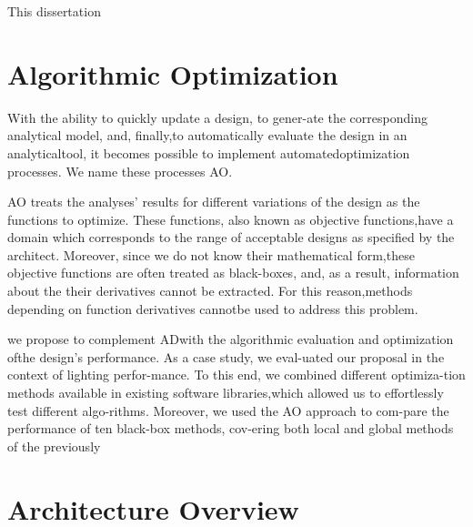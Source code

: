 \cleardoublepage
\label{chap:architecture}


This dissertation

\section{Algorithmic Optimization}

With the ability to quickly update a design, to gener-ate the corresponding analytical model, and, finally,to automatically evaluate the design in an analyticaltool, it becomes possible to implement automatedoptimization processes.  We name these processes \ac{AO}.

AO treats the analyses’ results for different variations of the design as the functions to optimize. These functions, also known as objective functions,have a domain which corresponds to the range of acceptable designs as specified by the architect. Moreover, since we do not know their mathematical form,these objective functions are often treated as black-boxes, and, as a result, information about the their derivatives cannot be extracted.  For this reason,methods depending on function derivatives cannotbe used to address this problem.  

we propose to complement ADwith the algorithmic evaluation and optimization ofthe design’s performance. As a case study, we eval-uated our proposal in the context of lighting perfor-mance. To this end, we combined different optimiza-tion methods available in existing software libraries,which allowed us to effortlessly test different algo-rithms. Moreover, we used the AO approach to com-pare the performance of ten black-box methods, cov-ering both local and global methods of the previously


\section{Architecture Overview} 







